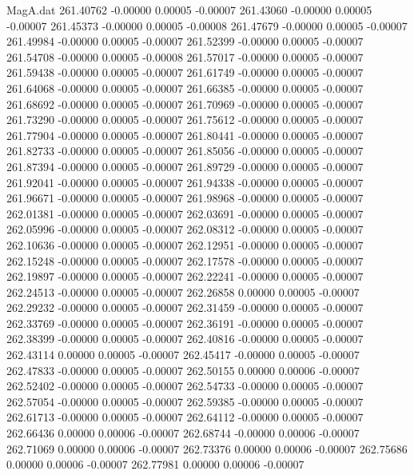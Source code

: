 \begin{filecontents}{MagA.dat}
 261.40762   -0.00000    0.00005   -0.00007
 261.43060   -0.00000    0.00005   -0.00007
 261.45373   -0.00000    0.00005   -0.00008
 261.47679   -0.00000    0.00005   -0.00007
 261.49984   -0.00000    0.00005   -0.00007
 261.52399   -0.00000    0.00005   -0.00007
 261.54708   -0.00000    0.00005   -0.00008
 261.57017   -0.00000    0.00005   -0.00007
 261.59438   -0.00000    0.00005   -0.00007
 261.61749   -0.00000    0.00005   -0.00007
 261.64068   -0.00000    0.00005   -0.00007
 261.66385   -0.00000    0.00005   -0.00007
 261.68692   -0.00000    0.00005   -0.00007
 261.70969   -0.00000    0.00005   -0.00007
 261.73290   -0.00000    0.00005   -0.00007
 261.75612   -0.00000    0.00005   -0.00007
 261.77904   -0.00000    0.00005   -0.00007
 261.80441   -0.00000    0.00005   -0.00007
 261.82733   -0.00000    0.00005   -0.00007
 261.85056   -0.00000    0.00005   -0.00007
 261.87394   -0.00000    0.00005   -0.00007
 261.89729   -0.00000    0.00005   -0.00007
 261.92041   -0.00000    0.00005   -0.00007
 261.94338   -0.00000    0.00005   -0.00007
 261.96671   -0.00000    0.00005   -0.00007
 261.98968   -0.00000    0.00005   -0.00007
 262.01381   -0.00000    0.00005   -0.00007
 262.03691   -0.00000    0.00005   -0.00007
 262.05996   -0.00000    0.00005   -0.00007
 262.08312   -0.00000    0.00005   -0.00007
 262.10636   -0.00000    0.00005   -0.00007
 262.12951   -0.00000    0.00005   -0.00007
 262.15248   -0.00000    0.00005   -0.00007
 262.17578   -0.00000    0.00005   -0.00007
 262.19897   -0.00000    0.00005   -0.00007
 262.22241   -0.00000    0.00005   -0.00007
 262.24513   -0.00000    0.00005   -0.00007
 262.26858    0.00000    0.00005   -0.00007
 262.29232   -0.00000    0.00005   -0.00007
 262.31459   -0.00000    0.00005   -0.00007
 262.33769   -0.00000    0.00005   -0.00007
 262.36191   -0.00000    0.00005   -0.00007
 262.38399   -0.00000    0.00005   -0.00007
 262.40816   -0.00000    0.00005   -0.00007
 262.43114    0.00000    0.00005   -0.00007
 262.45417   -0.00000    0.00005   -0.00007
 262.47833   -0.00000    0.00005   -0.00007
 262.50155    0.00000    0.00006   -0.00007
 262.52402   -0.00000    0.00005   -0.00007
 262.54733   -0.00000    0.00005   -0.00007
 262.57054   -0.00000    0.00005   -0.00007
 262.59385   -0.00000    0.00005   -0.00007
 262.61713   -0.00000    0.00005   -0.00007
 262.64112   -0.00000    0.00005   -0.00007
 262.66436    0.00000    0.00006   -0.00007
 262.68744   -0.00000    0.00006   -0.00007
 262.71069    0.00000    0.00006   -0.00007
 262.73376    0.00000    0.00006   -0.00007
 262.75686    0.00000    0.00006   -0.00007
 262.77981    0.00000    0.00006   -0.00007

\end{filecontents}
